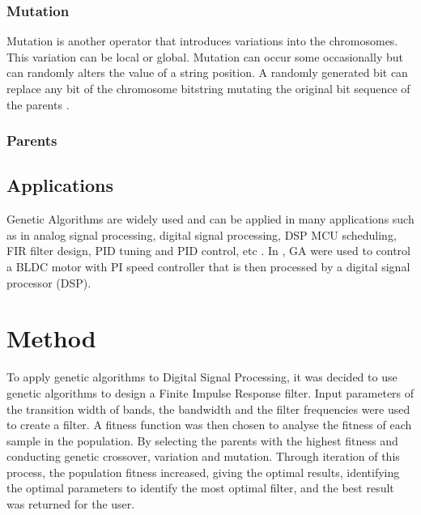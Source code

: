 \documentclass[a4paper, 11pt]{article}
\begin{document}
        \subsubsection{Mutation}
            Mutation is another operator that introduces variations into the chromosomes. This variation can be
            local or global. Mutation can occur some occasionally but can randomly alters the value of a string
            position. A randomly generated bit can replace any bit of the chromosome bitstring mutating the original
            bit sequence of the parents \cite{Tang1996}.

        \subsubsection{Parents}
        

        \subsection{Applications}
        Genetic Algorithms are widely used and can be applied in many applications such as in analog signal processing, 
        digital signal processing, DSP MCU scheduling, FIR filter design, PID tuning and PID control, etc 
        \cite{Chen2017, Fleming1993, Cao2012, Fabijanski2008, Miyata2018, Amphlett1996}. In \cite{Chen2017}, GA were used to control 
        a BLDC motor with PI speed controller that is then processed by a digital signal processor (DSP). 


\section{Method}\label{sec:meth}
    To apply genetic algorithms to Digital Signal Processing, it was decided to use genetic algorithms to design a 
    Finite Impulse Response filter. Input parameters of the transition width of bands, the bandwidth
    and the filter frequencies were used to create a filter. A fitness function was then chosen to analyse the fitness
    of each sample in the population. By selecting the parents with the highest fitness and conducting genetic crossover,
    variation and mutation. Through iteration of this process, the population fitness increased, giving the optimal results, 
    identifying the optimal parameters to identify the most optimal filter, and the best result was returned for the user.
\end{document}

